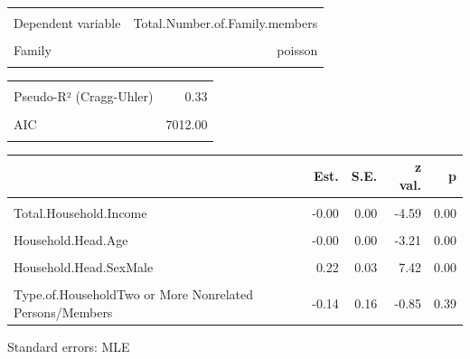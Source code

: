 \documentclass[
]{article}
\begin{document}
\begin{table}[!h]
\centering
\begin{tabular}{lr}
\toprule
\cellcolor{gray!6}{Observations} & \cellcolor{gray!6}{1724}\\
Dependent variable & Total.Number.of.Family.members\\
\cellcolor{gray!6}{Type} & \cellcolor{gray!6}{Generalized linear model}\\
Family & poisson\\
\cellcolor{gray!6}{Link} & \cellcolor{gray!6}{log}\\
\bottomrule
\end{tabular}
\end{table} \begin{table}[!h]
\centering
\begin{tabular}{lr}
\toprule
\cellcolor{gray!6}{$\chi^2$(7)} & \cellcolor{gray!6}{687.54}\\
Pseudo-R² (Cragg-Uhler) & 0.33\\
\cellcolor{gray!6}{Pseudo-R² (McFadden)} & \cellcolor{gray!6}{0.09}\\
AIC & 7012.00\\
\cellcolor{gray!6}{BIC} & \cellcolor{gray!6}{7055.62}\\
\bottomrule
\end{tabular}
\end{table} \begin{table}[!h]
\centering
\begin{threeparttable}
\begin{tabular}{lrrrr}
\toprule
  & Est. & S.E. & z val. & p\\
\midrule
\cellcolor{gray!6}{(Intercept)} & \cellcolor{gray!6}{1.43} & \cellcolor{gray!6}{0.07} & \cellcolor{gray!6}{21.27} & \cellcolor{gray!6}{0.00}\\
Total.Household.Income & -0.00 & 0.00 & -4.59 & 0.00\\
\cellcolor{gray!6}{Total.Food.Expenditure} & \cellcolor{gray!6}{0.05} & \cellcolor{gray!6}{0.00} & \cellcolor{gray!6}{14.29} & \cellcolor{gray!6}{0.00}\\
Household.Head.Age & -0.00 & 0.00 & -3.21 & 0.00\\
\cellcolor{gray!6}{House.Age} & \cellcolor{gray!6}{-0.00} & \cellcolor{gray!6}{0.00} & \cellcolor{gray!6}{-3.23} & \cellcolor{gray!6}{0.00}\\
\addlinespace
Household.Head.SexMale & 0.22 & 0.03 & 7.42 & 0.00\\
\cellcolor{gray!6}{Type.of.HouseholdSingle Family} & \cellcolor{gray!6}{-0.35} & \cellcolor{gray!6}{0.02} & \cellcolor{gray!6}{-14.08} & \cellcolor{gray!6}{0.00}\\
Type.of.HouseholdTwo or More Nonrelated Persons/Members & -0.14 & 0.16 & -0.85 & 0.39\\
\bottomrule
\end{tabular}
\begin{tablenotes}
\item Standard errors: MLE
\end{tablenotes}
\end{threeparttable}
\end{table}
\end{document}
